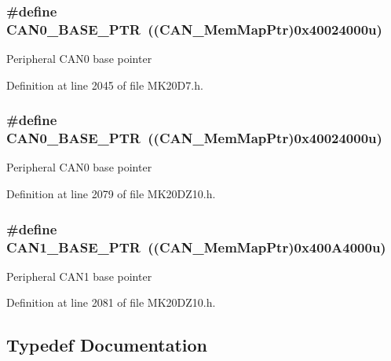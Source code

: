 \subsubsection[{\texorpdfstring{C\+A\+N0\+\_\+\+B\+A\+S\+E\+\_\+\+P\+TR}{CAN0_BASE_PTR}}]{\setlength{\rightskip}{0pt plus 5cm}\#define C\+A\+N0\+\_\+\+B\+A\+S\+E\+\_\+\+P\+TR~(({\bf C\+A\+N\+\_\+\+Mem\+Map\+Ptr})0x40024000u)}\hypertarget{group___c_a_n___peripheral_ga1ee8f499e10af9b8e3132e0168e519b9}{}\label{group___c_a_n___peripheral_ga1ee8f499e10af9b8e3132e0168e519b9}
Peripheral C\+A\+N0 base pointer 

Definition at line 2045 of file M\+K20\+D7.\+h.

\subsubsection[{\texorpdfstring{C\+A\+N0\+\_\+\+B\+A\+S\+E\+\_\+\+P\+TR}{CAN0_BASE_PTR}}]{\setlength{\rightskip}{0pt plus 5cm}\#define C\+A\+N0\+\_\+\+B\+A\+S\+E\+\_\+\+P\+TR~(({\bf C\+A\+N\+\_\+\+Mem\+Map\+Ptr})0x40024000u)}\hypertarget{group___c_a_n___peripheral_ga1ee8f499e10af9b8e3132e0168e519b9}{}\label{group___c_a_n___peripheral_ga1ee8f499e10af9b8e3132e0168e519b9}
Peripheral C\+A\+N0 base pointer 

Definition at line 2079 of file M\+K20\+D\+Z10.\+h.

\subsubsection[{\texorpdfstring{C\+A\+N1\+\_\+\+B\+A\+S\+E\+\_\+\+P\+TR}{CAN1_BASE_PTR}}]{\setlength{\rightskip}{0pt plus 5cm}\#define C\+A\+N1\+\_\+\+B\+A\+S\+E\+\_\+\+P\+TR~(({\bf C\+A\+N\+\_\+\+Mem\+Map\+Ptr})0x400\+A4000u)}\hypertarget{group___c_a_n___peripheral_ga810387eeeb9ccd0e09ae057ff6f0d2ca}{}\label{group___c_a_n___peripheral_ga810387eeeb9ccd0e09ae057ff6f0d2ca}
Peripheral C\+A\+N1 base pointer 

Definition at line 2081 of file M\+K20\+D\+Z10.\+h.



\subsection{Typedef Documentation}
